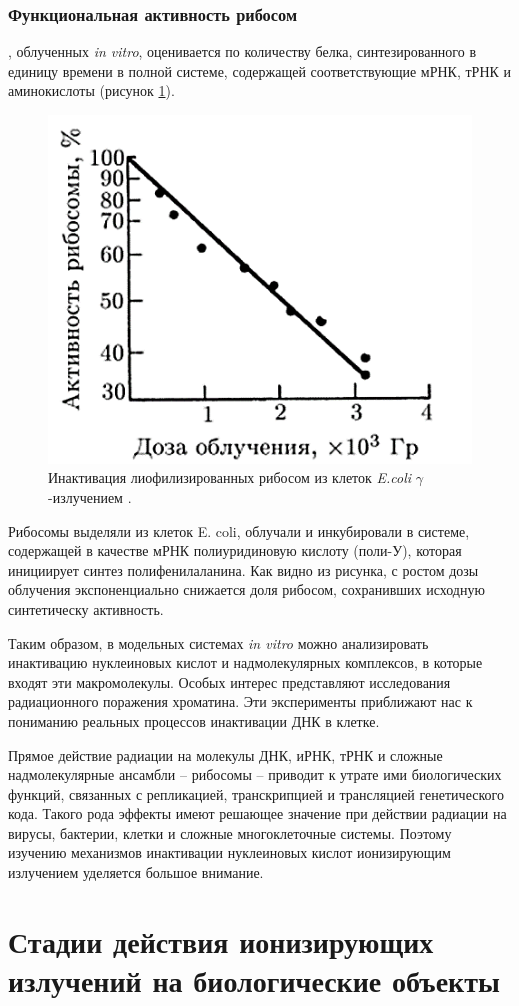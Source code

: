 \documentclass[a4paper, 14pt]{article}
\renewcommand{\emph}[1]{{\color{orange}{\textit{\textbf{#1}}}}}
\begin{document}
\subsubsection{Функциональная активность рибосом}
\emph{Функциональная активность рибосом}, облученных \textit{in vitro}, оценивается по
количеству белка, синтезированного в единицу времени в полной системе,
содержащей соответствующие мРНК, тРНК и аминокислоты (рисунок \ref{ribosomeInactivation}).
\begin{figure}[htbp]
    \centering
    \includegraphics[width=.5\textwidth]{ribosomeInactivation.png}
    \caption{Инактивация лиофилизированных рибосом из клеток \textit{E.coli} $\gamma$-излучением .}
    \label{ribosomeInactivation}
\end{figure}
Рибосомы выделяли из клеток E. coli, облучали и инкубировали в системе,
содержащей в качестве мРНК полиуридиновую кислоту (поли-У), которая инициирует
синтез полифенилаланина. Как видно из рисунка, с ростом дозы облучения
экспоненциально снижается доля рибосом, сохранивших исходную синтетическу
активность.

Таким образом, в модельных системах \textit{in vitro} можно анализировать инактивацию нуклеиновых кислот и надмолекулярных комплексов, в которые входят эти макромолекулы. Особых интерес представляют исследования радиационного поражения хроматина. Эти эксперименты приближают нас к пониманию реальных процессов инактивации ДНК в клетке.

Прямое действие радиации на молекулы ДНК, иРНК, тРНК и сложные надмолекулярные ансамбли – рибосомы – приводит к утрате ими биологических функций, связанных с репликацией, транскрипцией и трансляцией генетического кода. Такого рода эффекты имеют решающее значение при действии радиации на вирусы, бактерии, клетки и сложные многоклеточные системы. Поэтому изучению механизмов инактивации нуклеиновых кислот ионизирующим излучением уделяется большое внимание.

\section{Стадии действия ионизирующих излучений на биологические объекты}
\end{document}
